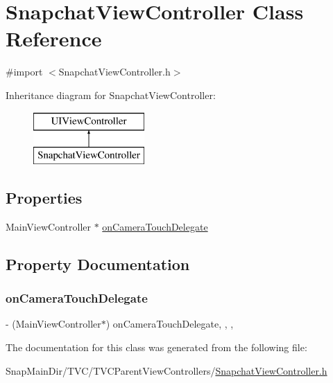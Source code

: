 \hypertarget{interface_snapchat_view_controller}{}\section{Snapchat\+View\+Controller Class Reference}
\label{interface_snapchat_view_controller}


{\ttfamily \#import $<$Snapchat\+View\+Controller.\+h$>$}

Inheritance diagram for Snapchat\+View\+Controller\+:\begin{figure}[H]
\begin{center}
\leavevmode
\includegraphics[height=2.000000cm]{interface_snapchat_view_controller}
\end{center}
\end{figure}
\subsection*{Properties}
\begin{DoxyCompactItemize}
\item 
Main\+View\+Controller $\ast$ \hyperlink{interface_snapchat_view_controller_a634bafc65a0d5bff2318789b4f81e74e}{on\+Camera\+Touch\+Delegate}
\end{DoxyCompactItemize}


\subsection{Property Documentation}
\hypertarget{interface_snapchat_view_controller_a634bafc65a0d5bff2318789b4f81e74e}{}\label{interface_snapchat_view_controller_a634bafc65a0d5bff2318789b4f81e74e} 
\subsubsection{\texorpdfstring{on\+Camera\+Touch\+Delegate}{onCameraTouchDelegate}}
{\footnotesize\ttfamily -\/ (Main\+View\+Controller$\ast$) on\+Camera\+Touch\+Delegate\hspace{0.3cm}{\ttfamily [read]}, {\ttfamily [write]}, {\ttfamily [nonatomic]}, {\ttfamily [weak]}}



The documentation for this class was generated from the following file\+:\begin{DoxyCompactItemize}
\item 
Snap\+Main\+Dir/\+T\+V\+C/\+T\+V\+C\+Parent\+View\+Controllers/\hyperlink{_snapchat_view_controller_8h}{Snapchat\+View\+Controller.\+h}\end{DoxyCompactItemize}
